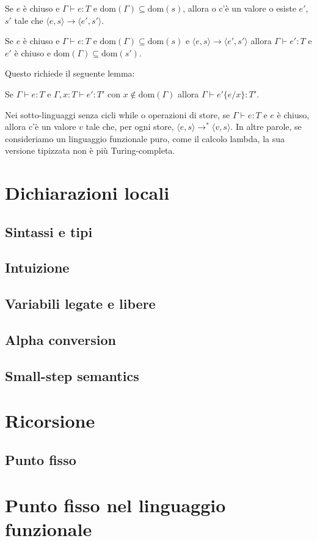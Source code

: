 \begin{theorem}[Progress]
Se $e$ è chiuso e $\Gamma \vdash e : T$ e $\text{dom}(\Gamma)
\subseteq \text{dom}(s)$, allora o c'è un valore o esiste $e'$, $s'$
tale che $\langle e,s \rangle \rightarrow \langle e',s' \rangle$.
\end{theorem}

\begin{theorem}
Se $e$ è chiuso e $\Gamma \vdash e : T$ e $\text{dom}(\Gamma)
\subseteq \text{dom}(s)$ e $\langle e,s \rangle \rightarrow
\langle e',s' \rangle$ allora $\Gamma \vdash e' : T$ e $e'$ è
chiuso e $\text{dom}(\Gamma) \subseteq \text{dom}(s')$.
\end{theorem}

Questo richiede il seguente lemma:

\begin{lemma}[Sostituzione]
Se $\Gamma \vdash e : T$ e $\Gamma,x : T \vdash e' : T'$ con
$x \notin \text{dom}(\Gamma)$ allora $\Gamma \vdash e'\{e/x\} : T'$.
\end{lemma}

\begin{theorem}[Normalizzazione]
Nei sotto-linguaggi senza cicli while o operazioni di store,
se $\Gamma \vdash e : T$ e $e$ è chiuso, allora c'è un valore $v$
tale che, per ogni store, $\langle e,s \rangle \rightarrow^* \langle
v,s \rangle$. In altre parole, se consideriamo un linguaggio funzionale
puro, come il calcolo lambda, la sua versione tipizzata non è più Turing-completa.
\end{theorem}
\section{Dichiarazioni locali}
\subsection{Sintassi e tipi}
\subsection{Intuizione}
\subsection{Variabili legate e libere}
\subsection{Alpha conversion}
\subsection{Small-step semantics}
\section{Ricorsione}
\subsection{Punto fisso}
\section{Punto fisso nel linguaggio funzionale}